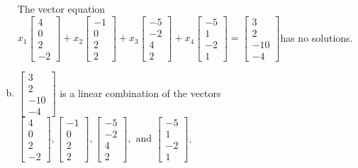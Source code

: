 \begin{exerciseAnswer}
\begin{enumerate}[(a)]
\begin{center}
\begin{minipage}{0.8\textwidth}
 The vector equation \( x_{1} \left[\begin{array}{c}
4 \\
0 \\
2 \\
-2
\end{array}\right] + x_{2} \left[\begin{array}{c}
-1 \\
0 \\
2 \\
2
\end{array}\right] + x_{3} \left[\begin{array}{c}
-5 \\
-2 \\
4 \\
2
\end{array}\right] + x_{4} \left[\begin{array}{c}
-5 \\
1 \\
-2 \\
1
\end{array}\right] = \left[\begin{array}{c}
3 \\
2 \\
-10 \\
-4
\end{array}\right] \)has no solutions.
\end{minipage}\end{center}
    
\item 

\( \left[\begin{array}{c}
3 \\
2 \\
-10 \\
-4
\end{array}\right] \) is a linear combination of the vectors \( \left[\begin{array}{c}
4 \\
0 \\
2 \\
-2
\end{array}\right] , \left[\begin{array}{c}
-1 \\
0 \\
2 \\
2
\end{array}\right] , \left[\begin{array}{c}
-5 \\
-2 \\
4 \\
2
\end{array}\right] , \text{ and } \left[\begin{array}{c}
-5 \\
1 \\
-2 \\
1
\end{array}\right] \). 


\end{enumerate}
    
\end{exerciseAnswer}
    
